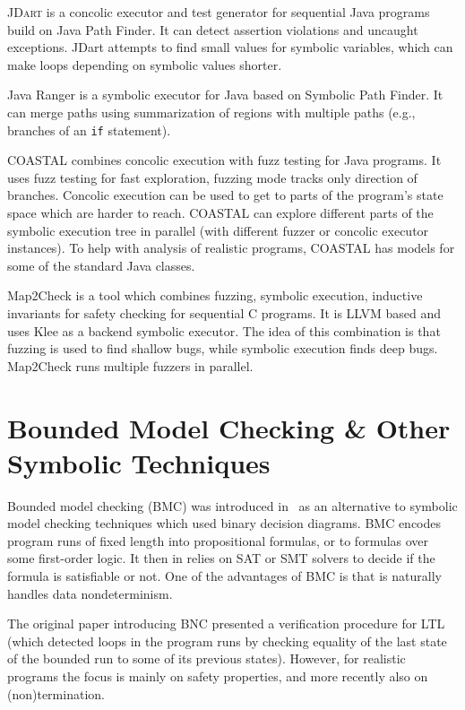 \textsc{JDart}  is a concolic executor and test generator for sequential Java programs build on Java Path Finder.
It can detect assertion violations and uncaught exceptions.
JDart attempts to find small values for symbolic variables, which can make loops depending on symbolic values shorter.

Java Ranger  is a symbolic executor for Java based on Symbolic Path Finder.
It can merge paths using summarization of regions with multiple paths (e.g., branches of an \texttt{if} statement). %

COASTAL  combines concolic execution with fuzz testing for Java programs.
It uses fuzz testing for fast exploration, fuzzing mode tracks only direction of branches.
Concolic execution can be used to get to parts of the program's state space which are harder to reach.
COASTAL can explore different parts of the symbolic execution tree in parallel (with different fuzzer or concolic executor instances).
To help with analysis of realistic programs, COASTAL has models for some of the standard Java classes. %

Map2Check  is a tool which combines fuzzing, symbolic execution, inductive invariants for safety checking for sequential C programs.
It is LLVM based and uses Klee as a backend symbolic executor.
The idea of this combination is that fuzzing is used to find shallow bugs, while symbolic execution finds deep bugs.
Map2Check runs multiple fuzzers in parallel.



\section{Bounded Model Checking \& Other Symbolic Techniques}

Bounded model checking (BMC) was introduced in~ as an alternative to
symbolic model checking techniques which used binary decision diagrams.
BMC encodes program runs of fixed length into propositional formulas, or to
formulas over some first-order logic.
It then in relies on SAT or SMT solvers to decide if the formula is satisfiable
or not.
One of the advantages of BMC is that is naturally handles data nondeterminism.

The original paper introducing BNC presented a verification procedure for LTL
(which detected loops in the program runs by checking equality of the last
state of the bounded run to some of its previous states).
However, for realistic programs the focus is mainly on safety properties, and
more recently also on (non)termination.

